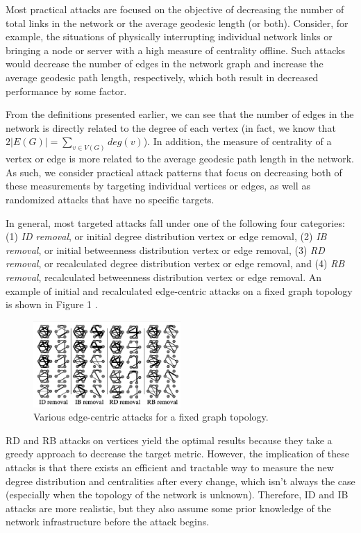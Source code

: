 \documentclass[doc]{apa}%
\begin{document}
Most practical attacks are focused on the objective of decreasing the number of total links in the network or the average geodesic length (or both). Consider, for example, the situations of physically interrupting individual network links or bringing a node or server with a high measure of centrality offline. Such attacks would decrease the number of edges in the network graph and increase the average geodesic path length, respectively, which both result in decreased performance by some factor.

From the definitions presented earlier, we can see that the number of edges in the network is directly related to the degree of each vertex (in fact, we know that $2|E(G)| =\sum_{v \in V(G)}deg(v)$). In addition, the measure of centrality of a vertex or edge is more related to the average geodesic path length in the network. As such, we consider practical attack patterns that focus on decreasing both of these measurements by targeting individual vertices or edges, as well as randomized attacks that have no specific targets. 

In general, most targeted attacks fall under one of the following four categories: (1) \emph{ID removal}, or initial degree distribution vertex or edge removal, (2) \emph{IB removal}, or initial betweenness distribution vertex or edge removal, (3) \emph{RD removal}, or recalculated degree distribution vertex or edge removal, and (4) \emph{RB removal}, recalculated betweenness distribution vertex or edge removal. An example of initial and recalculated edge-centric attacks on a fixed graph topology is shown in Figure 1 \cite{Attacks}.

\begin{figure}[h!]
	\label{fig:attackPics}
	\centering
		\includegraphics[width=0.5\textwidth]{edge_attacks.png}
	\caption{Various edge-centric attacks for a fixed graph topology.}
\end{figure}

RD and RB attacks on vertices yield the optimal results because they take a greedy approach to decrease the target metric. However, the implication of these attacks is that there exists an efficient and tractable way to measure the new degree distribution and centralities after every change, which isn't always the case (especially when the topology of the network is unknown). Therefore, ID and IB attacks are more realistic, but they also assume some prior knowledge of the network infrastructure before the attack begins. 
\end{document}

